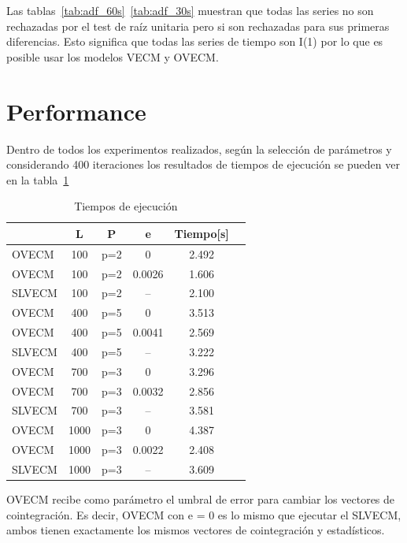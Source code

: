 Las tablas~\ref{tab:adf_60s}~\ref{tab:adf_30s} muestran que todas las series no
son rechazadas por el test de raíz unitaria pero si son rechazadas para sus
primeras diferencias. Esto significa que todas las series de tiempo son I(1)
por lo que es posible usar los modelos VECM y OVECM. 

\section{Performance}
Dentro de todos los experimentos realizados, según la selección de parámetros
y considerando 400 iteraciones los resultados de tiempos de ejecución se pueden
ver en la tabla~\ref{tab:extimes}

\begin{table}[h!]
\caption{Tiempos de ejecución}
\label{tab:extimes}
\begin{center}
\begin{tabular}{|l|c|c|c|c|c|}
\hline
& L & P & e  & Tiempo[s] \\
\hline
OVECM & 100 &p=2  & 0      & 2.492\\
OVECM & 100 &p=2  & 0.0026  & 1.606\\
SLVECM & 100 &p=2& -- & 2.100\\
\hline
OVECM & 400 & p=5  & 0      & 3.513\\
OVECM & 400 &p=5  & 0.0041  & 2.569\\
SLVECM & 400 & p=5 & -- & 3.222\\
\hline
OVECM & 700 &p=3  & 0      & 3.296\\
OVECM & 700 &p=3  & 0.0032  & 2.856\\
SLVECM & 700 &p=3 & -- & 3.581\\
\hline
OVECM & 1000 & p=3 & 0      & 4.387\\
OVECM & 1000 & p=3  & 0.0022  & 2.408\\
SLVECM & 1000 & p=3  & -- & 3.609\\
\hline
\end{tabular}
\end{center}
\end{table}

OVECM recibe como parámetro el umbral de error para cambiar los vectores de
cointegración. Es decir, OVECM con e = 0 es lo mismo que ejecutar el SLVECM,
ambos tienen exactamente los mismos vectores de cointegración y estadísticos.

